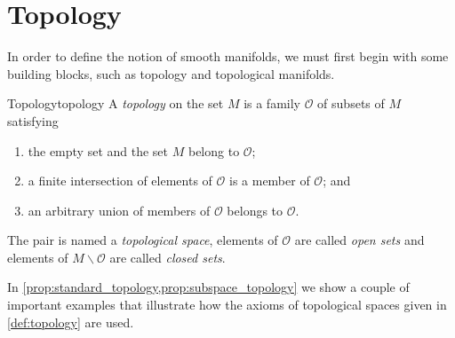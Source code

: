 \section{Topology}

In order to define the notion of smooth manifolds, we must first begin with some building blocks, such as topology and topological manifolds.

\begin{definition}{Topology}{topology}
    A \emph{topology} on the set \(M\) is a family \(\mathcal{O}\) of subsets of \(M\) satisfying
    \begin{enumerate}[label=(\alph*)]
        \item the empty set and the set \(M\) belong to \(\mathcal{O}\);
        \item a finite intersection of elements of \(\mathcal{O}\) is a member of \(\mathcal{O}\); and
        \item an arbitrary union of members of \(\mathcal{O}\) belongs to \(\mathcal{O}\).
    \end{enumerate}

    The pair  is named a \emph{topological space}, elements of \(\mathcal{O}\) are called \emph{open sets} and elements of \(M\smallsetminus\mathcal{O}\) are called \emph{closed sets}.
\end{definition}

In \cref{prop:standard_topology,prop:subspace_topology} we show a couple of important examples that illustrate how the axioms of topological spaces given in \cref{def:topology} are used.


